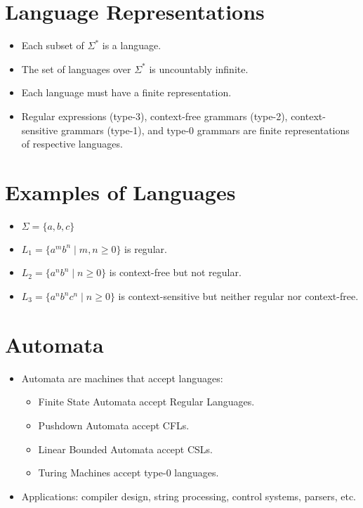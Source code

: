 \documentclass[12pt,a4paper]{article}
\begin{document}
\section{Language Representations}
\begin{itemize}
    \item Each subset of $\Sigma^*$ is a language.
    \item The set of languages over $\Sigma^*$ is uncountably infinite.
    \item Each language must have a finite representation.
    \item Regular expressions (type-3), context-free grammars (type-2), context-sensitive grammars (type-1), and type-0 grammars are finite representations of respective languages.
\end{itemize}

\section{Examples of Languages}
\begin{itemize}
    \item $\Sigma = \{a, b, c\}$
    \item $L_1 = \{a^m b^n \mid m, n \geq 0\}$ is regular.
    \item $L_2 = \{a^n b^n \mid n \geq 0\}$ is context-free but not regular.
    \item $L_3 = \{a^n b^n c^n \mid n \geq 0\}$ is context-sensitive but neither regular nor context-free.
\end{itemize}

\section{Automata}
\begin{itemize}
    \item Automata are machines that accept languages:
    \begin{itemize}
        \item Finite State Automata accept Regular Languages.
        \item Pushdown Automata accept CFLs.
        \item Linear Bounded Automata accept CSLs.
        \item Turing Machines accept type-0 languages.
    \end{itemize}
    \item Applications: compiler design, string processing, control systems, parsers, etc.
\end{itemize}
\end{document}
